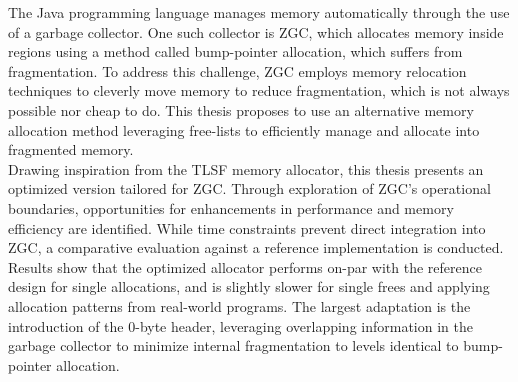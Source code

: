 
The Java programming language manages memory automatically through the use of a garbage collector. One such collector is ZGC, which allocates memory inside regions using a method called bump-pointer allocation, which suffers from fragmentation. To address this challenge, ZGC employs memory relocation techniques to cleverly move memory to reduce fragmentation, which is not always possible nor cheap to do. This thesis proposes to use an alternative memory allocation method leveraging free-lists to efficiently manage and allocate into fragmented memory.\\

Drawing inspiration from the TLSF memory allocator, this thesis presents an optimized version tailored for ZGC. Through exploration of ZGC's operational boundaries, opportunities for enhancements in performance and memory efficiency are identified. While time constraints prevent direct integration into ZGC, a comparative evaluation against a reference implementation is conducted. Results show that the optimized allocator performs on-par with the reference design for single allocations, and is slightly slower for single frees and applying allocation patterns from real-world programs. The largest adaptation is the introduction of the 0-byte header, leveraging overlapping information in the garbage collector to minimize internal fragmentation to levels identical to bump-pointer allocation.\\


